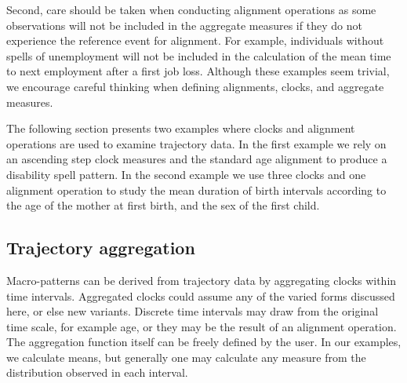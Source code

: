 \documentclass{article}
\begin{document}
Second, care should be taken when conducting alignment operations as some observations will not be included in the aggregate measures if they do not experience the reference event for alignment. For example, individuals without spells of unemployment will not be included in the calculation of the mean time to next employment after a first job loss. Although these examples seem trivial, we encourage careful thinking when defining alignments, clocks, and aggregate measures.

The following section presents two examples where clocks and alignment operations are used to examine trajectory data. In the first example we rely on an ascending step clock measures and the standard age alignment to produce a disability spell pattern. In the second example we use three clocks and one alignment operation to study the mean duration of birth intervals according to the age of the mother at first birth, and the sex of the first child.


\FloatBarrier
\subsection{Trajectory aggregation}
Macro-patterns can be derived from trajectory data by aggregating clocks within time intervals. Aggregated clocks could assume any of the varied forms discussed here, or else new variants. Discrete time intervals may draw from the original time scale, for example age, or they may be the result of an alignment operation. The aggregation function itself can be freely defined by the user. In our examples, we calculate means, but generally one may calculate any measure from the distribution observed in each interval.
\end{document}
